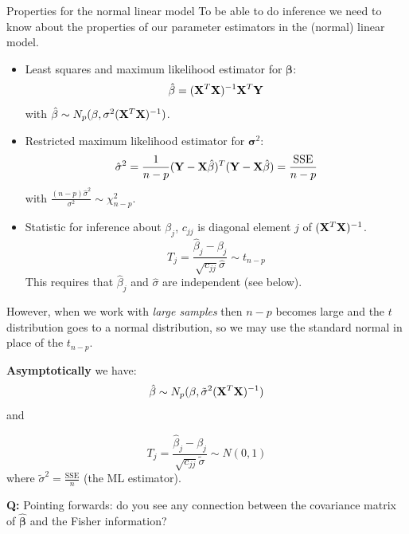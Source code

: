 \documentclass[
  ignorenonframetext,
]{beamer}
\begin{document}
\begin{frame}{Properties for the normal linear model}
\protect{}\label{properties-for-the-normal-linear-model}
To be able to do inference we need to know about the properties of our
parameter estimators in the (normal) linear model.

\begin{itemize}
\item
  Least squares and maximum likelihood estimator for
  \({\boldsymbol \beta}\):
  \[ \hat{\beta}=({\bf X}^T{\bf X})^{-1} {\bf X}^T {\bf Y}\] with
  \(\hat{\beta}\sim N_{p}(\beta,\sigma^2({\bf X}^T{\bf X})^{-1})\).
\item
  Restricted maximum likelihood estimator for
  \({\boldsymbol \sigma}^2\):
  \[ \hat{\sigma}^2=\frac{1}{n-p}({\bf Y}-{\bf X}\hat{\beta})^T({\bf Y}-{\bf X}\hat{\beta})=\frac{\text{SSE}}{n-p}\]
  with \(\frac{(n-p)\hat{\sigma}^2}{\sigma^2} \sim \chi^2_{n-p}\).
\item
  Statistic for inference about \(\beta_j\), \(c_{jj}\) is diagonal
  element \(j\) of \(({\bf X}^T{\bf X})^{-1}\).
  \[ T_j=\frac{\hat{\beta}_j-\beta_j}{\sqrt{c_{jj}}\hat{\sigma}}\sim t_{n-p}\]
  This requires that \(\hat{\beta}_j\) and \(\hat{\sigma}\) are
  independent (see below).
\end{itemize}
\end{frame}

\begin{frame}
However, when we work with \emph{large samples} then \(n-p\) becomes
large and the \(t\) distribution goes to a normal distribution, so we
may use the standard normal in place of the \(t_{n-p}\).

\textbf{Asymptotically} we have:
\[\hat{\beta}\sim N_{p}(\beta,\tilde{\sigma}^2({\bf X}^T{\bf X})^{-1})\]
and

\[T_j=\frac{\hat{\beta}_j-\beta_j}{\sqrt{c_{jj}}\tilde{\sigma}}\sim N(0,1)\]
where \(\tilde{\sigma}^2=\frac{\text{SSE}}{n}\) (the ML estimator).

\textbf{Q:} Pointing forwards: do you see any connection between the
covariance matrix of \(\hat{\boldsymbol{\beta}}\) and the Fisher
information?
\end{frame}
\end{document}
